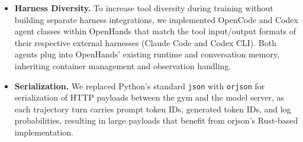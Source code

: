 \begin{itemize}
    \item \textbf{Harness Diversity.} To increase tool diversity during training without building separate harness integrations, we implemented OpenCode and Codex agent classes within OpenHands that match the tool input/output formats of their respective external harnesses (Claude Code and Codex CLI). Both agents plug into OpenHands' existing runtime and conversation memory, inheriting container management and observation handling. 

    \item \textbf{Serialization.} We replaced Python's standard \texttt{json} with \texttt{orjson} for serialization of HTTP payloads between the gym and the model server, as each trajectory turn carries prompt token IDs, generated token IDs, and log probabilities, resulting in large payloads that benefit from orjson's Rust-based implementation.
\end{itemize}

